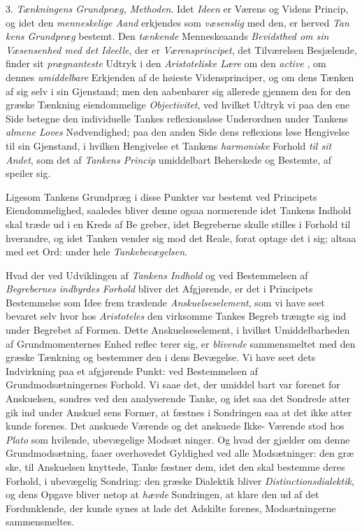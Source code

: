 3. \emph{Tænkningens Grundpræg, Methoden}. Idet \emph{Ideen}
er Værens og Videns Princip, og idet den \emph{menneskelige
Aand} erkjendes som \emph{væsenslig} med den, er herved \emph{Tan\-%
kens Grundpræg} bestemt. Den \emph{tænkende} Menneskeaands
\emph{Bevidsthed om sin Væsensenhed med det Ideelle},
der er \emph{Værensprincipet}, det Tilværelsen Besjælende, finder
sit \emph{prægnanteste} Udtryk i den \emph{Aristoteliske Lære} om
den \emph{active} , om dennes \emph{umiddelbare} Erkjenden af
de høieste Vidensprinciper, og om dens Tænken af sig selv i
sin Gjenstand; men den aabenbarer sig allerede gjennem den
for den græske Tænkning eiendommelige \emph{Objectivitet}, ved
hvilket Udtryk vi paa den ene Side betegne den individuelle
Tankes reflexionsløse Underordnen under Tankens \emph{almene
Loves} Nødvendighed; paa den anden Side dens reflexions\-%
løse Hengivelse til sin Gjenstand, i hvilken Hengivelse et
Tankens \emph{harmoniske} Forhold \emph{til sit Andet}, som det af
\emph{Tankens Princip} umiddelbart Beherskede og Bestemte, af\-%
speiler sig.

Ligesom Tankens Grundpræg i disse Punkter var bestemt
ved Principets Eiendommelighed, saaledes bliver denne ogsaa
normerende idet Tankens Indhold skal træde ud i en Kreds af Be\-%
greber, idet Begreberne skulle stilles i Forhold til hverandre, og
idet Tanken vender sig mod det Reale, forat optage det i sig;
altsaa med eet Ord: under hele \emph{Tankebevægelsen}.

Hvad der ved Udviklingen af \emph{Tankens Indhold} og ved
Bestemmelsen af \emph{Begrebernes indbyrdes Forhold} bliver
det Afgjørende, er det i Principets Bestemmelse som Idee frem\-%
trædende \emph{Anskuelseselement}, som vi have seet bevaret selv
hvor hos \emph{Aristoteles} den virksomme Tankes Begreb trængte
sig ind under Begrebet af Formen. Dette Anskuelseselement, i
hvilket Umiddelbarheden af Grundmomenternes Enhed reflec\-%
terer sig, er \emph{blivende} sammensmeltet med den græske
Tænkning og bestemmer den i dens Bevægelse. Vi have seet
dets Indvirkning paa et afgjørende Punkt: ved Bestemmelsen
af Grundmodsætningernes Forhold. Vi saae det, der umiddel\-%
bart var forenet for Anskuelsen, sondres ved den analyserende
Tanke, og idet saa det Sondrede atter gik ind under Anskuel\-%
sens Former, at fæstnes i Sondringen saa at det ikke atter
kunde forenes. Det anskuede Værende og det anskuede Ikke-%
Værende stod hos \emph{Plato} som hvilende, ubevægelige Modsæt\-%
ninger. Og hvad der gjælder om denne Grundmodsætning,
faaer overhovedet Gyldighed ved alle Modsætninger: den græ\-%
ske, til Anskuelsen knyttede, Tanke fæstner dem, idet den
skal bestemme deres Forhold, i ubevægelig Sondring: den
græske Dialektik bliver \emph{Distinctionsdialektik}, og dens
Opgave bliver netop at \emph{hævde} Sondringen, at klare den ud
af det Fordunklende, der kunde synes at lade det Adskilte
forenes, Modsætningerne sammensmeltes.

